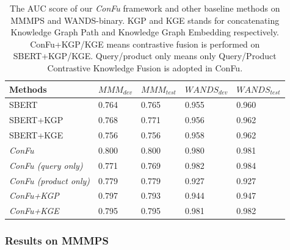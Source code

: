\begin{table}[!th]
  \centering
  \setlength{\tabcolsep}{5pt}
  \begin{threeparttable}
  \caption{The AUC score of our \textit{ConFu} framework and other baseline methods on MMMPS and WANDS-binary. KGP and KGE stands for concatenating Knowledge Graph Path and Knowledge Graph Embedding respectively. ConFu+KGP/KGE means contrastive fusion is performed on SBERT+KGP/KGE. Query/product only means only Query/Product Contrastive Knowledge Fusion is adopted in ConFu. }
  \label{tb:mt}
  \centering
  \begin{tabular}{l|l|l|l|l}
    \toprule
    Methods & ${MMM}_{dev}$  & ${MMM}_{test}$ & ${WANDS}_{dev}$  & ${WANDS}_{test}$ \\
    \midrule
    SBERT & 0.764 & 0.765 & 0.955 & 0.960 \\
    SBERT+KGP & 0.768 & 0.771 & 0.956 & 0.962 \\
    SBERT+KGE & 0.756 & 0.756 & 0.958 & 0.962 \\
    \midrule
    \textit{ConFu}  & 0.800 & 0.800 & 0.980 & 0.981  \\
    \textit{ConFu (query only)}  & 0.771 & 0.769 & 0.982 & 0.984 \\
    \textit{ConFu (product only)} & 0.779 & 0.779 & 0.927 & 0.927 \\
    \textit{ConFu+KGP} & 0.797 & 0.793 & 0.944 & 0.947  \\
    \textit{ConFu+KGE} & 0.795 & 0.795 & 0.981 & 0.982 \\
    \bottomrule
  \end{tabular}
  \end{threeparttable}
\end{table}

\subsubsection{Results on MMMPS}

